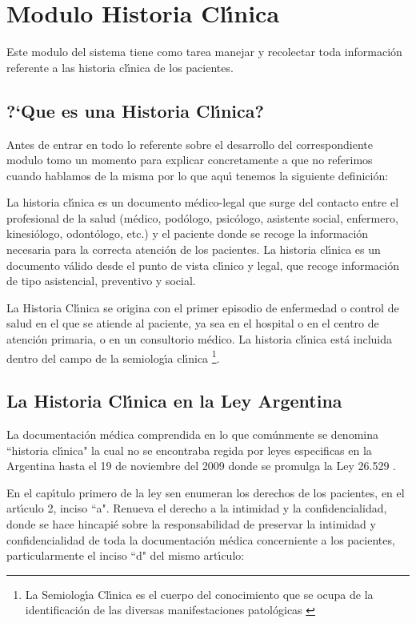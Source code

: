 \section{Modulo Historia Cl\'{\i}nica}

Este modulo del sistema tiene como tarea manejar y recolectar toda informaci\'on 
referente a las historia cl\'{\i}nica de los pacientes.


\subsection{?`Que es una Historia Cl\'{\i}nica?}

Antes de entrar en todo lo referente sobre el desarrollo del correspondiente modulo
tomo un momento para explicar concretamente a que no referimos cuando hablamos de 
la misma por lo que aqu\'{\i} tenemos la siguiente definici\'on:

La historia cl\'{\i}nica es un documento m\'edico-legal que surge del contacto entre el 
profesional de la salud (m\'edico, pod\'ologo, psic\'ologo, asistente social, enfermero, 
kinesi\'ologo, odont\'ologo, etc.) y el paciente donde se recoge la informaci\'on necesaria 
para la correcta atenci\'on de los pacientes. La historia cl\'{\i}nica es un documento 
v\'alido desde el punto de vista cl\'{\i}nico y legal, que recoge informaci\'on de tipo 
asistencial, preventivo y social.

La Historia Cl\'{\i}nica se origina con el primer episodio de enfermedad o control de salud en 
el que se atiende al paciente, ya sea en el hospital o en el centro de atenci\'on primaria, 
o en un consultorio m\'edico. La historia cl\'{\i}nica est\'a incluida dentro del campo de la 
semiolog\'{\i}a cl\'{\i}nica \footnote{La Semiolog\'{\i}a Cl\'{\i}nica es el cuerpo del conocimiento
que se ocupa de la identificaci\'on de las diversas manifestaciones patol\'ogicas 
\cite{SemiClin}}.

\subsection{La Historia Cl\'{\i}nica en la Ley Argentina}

La documentaci\'on m\'edica comprendida en lo que com\'unmente se denomina ``historia 
cl\'{\i}nica" la cual no se encontraba regida por leyes especificas en la Argentina hasta
el 19 de noviembre del 2009 donde se promulga la Ley 26.529 \cite{LeyHC}.

En el cap\'{\i}tulo primero de la ley sen enumeran los derechos de los pacientes, 
en el art\'{\i}culo 2, inciso ``a". Renueva el derecho a la intimidad y la confidencialidad, 
donde se hace hincapi\'e sobre la responsabilidad de preservar la intimidad y 
confidencialidad de toda la documentaci\'on m\'edica concerniente a los pacientes, 
particularmente el inciso ``d" del mismo art\'{\i}culo:

